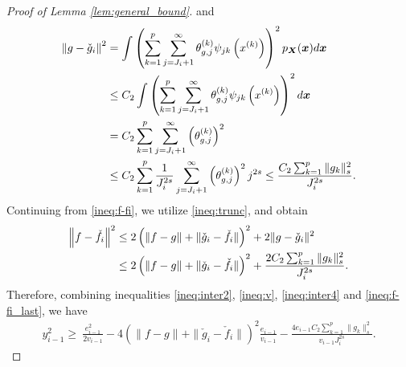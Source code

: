 \begin{proof}[Proof of Lemma \ref{lem:general_bound}]
and
\begin{align}
    \left\|g - \check g_i\right\|^2 &= \int \left( \sum_{k=1}^p\sum_{j=J_i+1}^\infty \theta_{g,j}^{(k)}\psi_{jk}\left(x^{(k)}\right) \right)^2 p_{\bm{X}}(\boldsymbol{x}) d\boldsymbol{x} \notag\\
    &\leq C_2 \int \left( \sum_{k=1}^p\sum_{j=J_i+1}^\infty \theta_{g,j}^{(k)}\psi_{jk}\left(x^{(k)}\right) \right)^2 d\boldsymbol{x} \notag\\
    &= C_2 \sum_{k=1}^p\sum_{j = J_i+1}^\infty \left(\theta_{g,j}^{(k)}\right)^2 \notag\\
    &\leq  C_2\sum_{k=1}^p \frac{1}{J_i^{2s}}\sum_{j = J_i+1}^\infty \left(\theta_{g,j}^{(k)}\right)^2j^{2s} \leq \frac{C_2\sum_{k=1}^p\|g_k\|_s^2}{J_i^{2s}}.\label{ineq:trunc}
\end{align}  
Continuing from \eqref{ineq:f-fi}, we utilize \eqref{ineq:trunc}, and obtain 
\begin{align}
   \left\|f - \check f_i\right\|^2&\leq  2\left(\|f - g\| + \|\check g_i - \check f_i\|\right)^2 + 2\|g - \check g_i \|^2 \notag\\
   &\leq 2\left(\|f - g\| + \|\check g_i - \check f_i\|\right)^2 + \frac{2C_2\sum_{k=1}^p\|g_k\|_s^2}{J_i^{2s}}.\label{ineq:f-fi_last}
\end{align}
Therefore, combining inequalities \eqref{ineq:inter2}, \eqref{ineq:v}, \eqref{ineq:inter4} and \eqref{ineq:f-fi_last}, we have 
\begin{align*}
y_{i-1}^2
\geq~\frac{e_{i-1}^2}{2v_{i-1}}- 4\left(\|f - g\| + \|\check g_i - \check f_i\|\right)^2\frac{e_{i-1}}{v_{i-1}} - \frac{4e_{i-1}C_2\sum_{k=1}^p\|g_k\|_s^2}{v_{i-1}J_i^{2s}}. \tag*{\qedhere}
\end{align*}
\end{proof}


